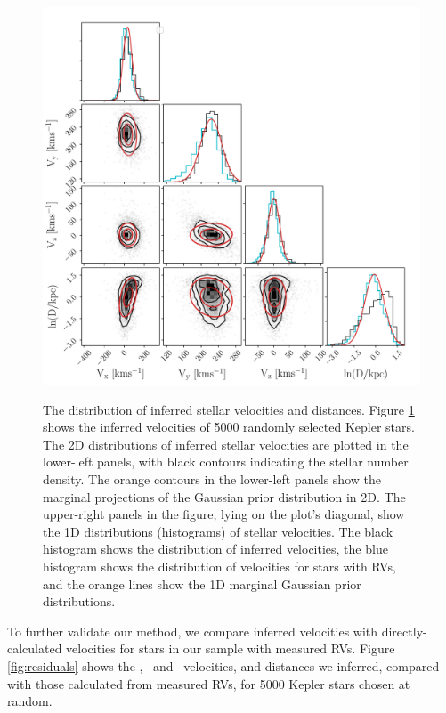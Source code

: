 \begin{figure}[ht!]
\caption{
The distribution of inferred stellar velocities and distances.
    Figure \ref{fig:results} shows the inferred velocities of 5000 randomly
selected Kepler stars.
The 2D distributions of inferred stellar velocities are plotted in the
lower-left panels, with black contours indicating the stellar number density.
The orange contours in the lower-left panels show the marginal projections of
    the Gaussian prior distribution in 2D.
The upper-right panels in the figure, lying on the plot's diagonal, show the
    1D distributions (histograms) of stellar velocities.
The black histogram shows the distribution of inferred velocities, the blue
histogram shows the distribution of velocities for stars with RVs,
and the orange lines show the 1D marginal Gaussian prior distributions.
}
  \centering
    \includegraphics[width=1\textwidth]{results}
\label{fig:results}
\end{figure}
To further validate our method, we compare inferred velocities with
directly-calculated velocities for stars in our sample with measured RVs.
Figure \ref{fig:residuals} shows the \vx, \vy\ and \vz\ velocities, and
distances we inferred, compared with those calculated from measured RVs, for
5000 Kepler stars chosen at random.
